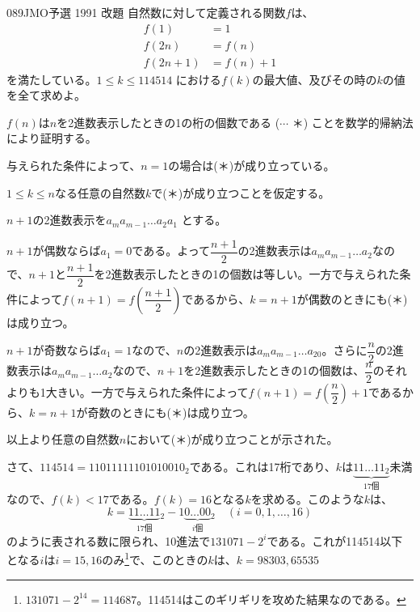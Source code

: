 \begin{prob}{089}{}{JMO予選 1991 改題}
 自然数に対して定義される関数$f$は、
 \begin{align*}
  f(1)&=1 \\
  f(2n)&=f(n) \\
  f(2n+1)&=f(n)+1
 \end{align*}
 を満たしている。$1\le k \le 114514$ における$f(k)$の最大値、及びその時の$k$の値を全て求めよ。
\end{prob}

$f(n)$は$n$を2進数表示したときの1の桁の個数である ($\cdots$ ＊) ことを数学的帰納法により証明する。

与えられた条件によって、$n=1$の場合は(＊)が成り立っている。

$1\le k \le n$なる任意の自然数$k$で(＊)が成り立つことを仮定する。

$n+1$の2進数表示を$a_ma_{m-1}\dots a_2a_1$ とする。

$n+1$が偶数ならば$a_1=0$である。よって$\dfrac{n+1}{2}$の2進数表示は$a_ma_{m-1}\dots a_2$なので、$n+1$と$\dfrac{n+1}{2}$を2進数表示したときの1の個数は等しい。一方で与えられた条件によって$f(n+1)=f\left(\dfrac{n+1}{2}\right)$であるから、$k=n+1$が偶数のときにも(＊)は成り立つ。

$n+1$が奇数ならば$a_1=1$なので、$n$の2進数表示は$a_ma_{m-1}\dots a_20$。さらに$\dfrac{n}{2}$の2進数表示は$a_ma_{m-1}\dots a_2$なので、$n+1$を2進数表示したときの1の個数は、$\dfrac{n}{2}$のそれよりも1大きい。一方で与えられた条件によって$f(n+1)=f\left(\dfrac{n}{2}\right)+1$であるから、$k=n+1$が奇数のときにも(＊)は成り立つ。

以上より任意の自然数$n$において(＊)が成り立つことが示された。

さて、$114514=11011111101010010_2$である。これは17桁であり、$k$は$\underbrace{11\dots 11_2}_{\text{17個}}$未満なので、$f(k)<17$である。$f(k)=16$となる$k$を求める。このような$k$は、
\[ k=\underbrace{11\dots 11}_{\text{17個}}{}_2 - 1\underbrace{0\dots 00}_{i\text{個}}{}_2 \quad (i=0, 1,\dots , 16) \]
のように表される数に限られ、10進法で$131071-2^i$である。これが114514以下となる$i$は$i=15,16$のみ\footnote{$131071-2^{14}=114687$。114514はこのギリギリを攻めた結果なのである。}で、このときの$k$は、$k=98303, 65535$